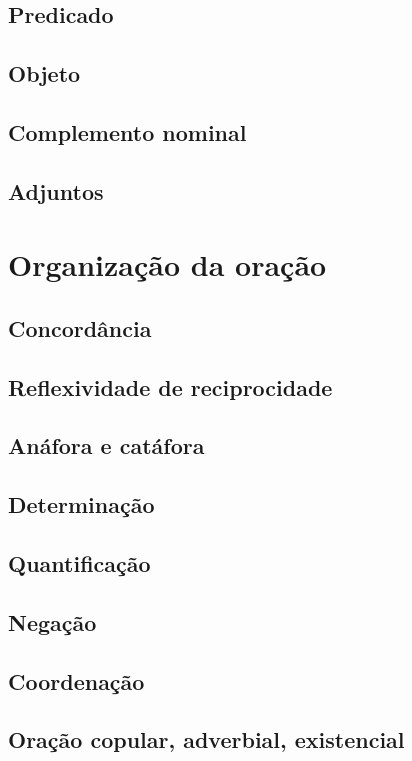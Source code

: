 \subsection{Predicado}
\lipsum[12]
\subsection{Objeto}
\lipsum[13]
\subsection{Complemento nominal}\label{sec:complnom}
\lipsum[14]
\subsection{Adjuntos}
\lipsum[15]

\section{Organização da oração}
\lipsum[16]
\subsection{Concordância}
\lipsum[17]
\subsection{Reflexividade de reciprocidade}\label{5.3.2}
\lipsum[18]
\subsection{Anáfora e catáfora}
\lipsum[19]
\subsection{Determinação}
\lipsum[20]
\subsection{Quantificação}\label{5.3.5}
\lipsum[21]
\subsection{Negação}\label{sec:negacao}
\lipsum[22]
\subsection{Coordenação}
\lipsum[23]
\subsection{Oração copular, adverbial, existencial}
\lipsum[24]

